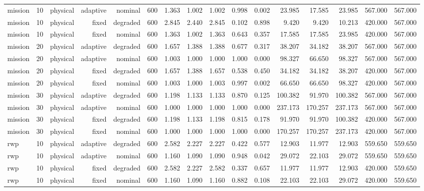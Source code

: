 \begin{tabular}{lrrrrrrrrrrrrrrr}
mission & 10 & physical & adaptive & nominal & 600 & 1.363 & 1.002 & 1.002 & 0.998 & 0.002 & 23.985 & 17.585 & 23.985 & 567.000 & 567.000 \\
mission & 10 & physical & fixed & degraded & 600 & 2.845 & 2.440 & 2.845 & 0.102 & 0.898 & 9.420 & 9.420 & 10.213 & 420.000 & 567.000 \\
mission & 10 & physical & fixed & nominal & 600 & 1.363 & 1.002 & 1.363 & 0.643 & 0.357 & 17.585 & 17.585 & 23.985 & 420.000 & 567.000 \\
mission & 20 & physical & adaptive & degraded & 600 & 1.657 & 1.388 & 1.388 & 0.677 & 0.317 & 38.207 & 34.182 & 38.207 & 567.000 & 567.000 \\
mission & 20 & physical & adaptive & nominal & 600 & 1.003 & 1.000 & 1.000 & 1.000 & 0.000 & 98.327 & 66.650 & 98.327 & 567.000 & 567.000 \\
mission & 20 & physical & fixed & degraded & 600 & 1.657 & 1.388 & 1.657 & 0.538 & 0.450 & 34.182 & 34.182 & 38.207 & 420.000 & 567.000 \\
mission & 20 & physical & fixed & nominal & 600 & 1.003 & 1.000 & 1.003 & 0.997 & 0.002 & 66.650 & 66.650 & 98.327 & 420.000 & 567.000 \\
mission & 30 & physical & adaptive & degraded & 600 & 1.198 & 1.133 & 1.133 & 0.870 & 0.125 & 100.382 & 91.970 & 100.382 & 567.000 & 567.000 \\
mission & 30 & physical & adaptive & nominal & 600 & 1.000 & 1.000 & 1.000 & 1.000 & 0.000 & 237.173 & 170.257 & 237.173 & 567.000 & 567.000 \\
mission & 30 & physical & fixed & degraded & 600 & 1.198 & 1.133 & 1.198 & 0.815 & 0.178 & 91.970 & 91.970 & 100.382 & 420.000 & 567.000 \\
mission & 30 & physical & fixed & nominal & 600 & 1.000 & 1.000 & 1.000 & 1.000 & 0.000 & 170.257 & 170.257 & 237.173 & 420.000 & 567.000 \\
rwp & 10 & physical & adaptive & degraded & 600 & 2.582 & 2.227 & 2.227 & 0.422 & 0.577 & 12.903 & 11.977 & 12.903 & 559.650 & 559.650 \\
rwp & 10 & physical & adaptive & nominal & 600 & 1.160 & 1.090 & 1.090 & 0.948 & 0.042 & 29.072 & 22.103 & 29.072 & 559.650 & 559.650 \\
rwp & 10 & physical & fixed & degraded & 600 & 2.582 & 2.227 & 2.582 & 0.337 & 0.657 & 11.977 & 11.977 & 12.903 & 420.000 & 559.650 \\
rwp & 10 & physical & fixed & nominal & 600 & 1.160 & 1.090 & 1.160 & 0.882 & 0.108 & 22.103 & 22.103 & 29.072 & 420.000 & 559.650 \\

\end{tabular}
